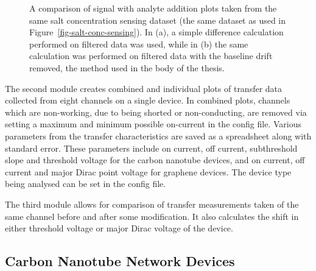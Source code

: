 \documentclass[
  a4paper,
]{scrbook}
\begin{document}
\begin{figure}
\begin{minipage}[t]{0.50\linewidth}
{{}

}

\subcaption{\label{fig-spaa-detrend}}
\end{minipage}%

\caption{\label{fig-spaa-plot-comparison}A comparison of signal with
analyte addition plots taken from the same salt concentration sensing
dataset (the same dataset as used in
Figure~\ref{fig-salt-conc-sensing}). In (a), a simple difference
calculation performed on filtered data was used, while in (b) the same
calculation was performed on filtered data with the baseline drift
removed, the method used in the body of the thesis.}

\end{figure}

The second module creates combined and individual plots of transfer data
collected from eight channels on a single device. In combined plots,
channels which are non-working, due to being shorted or non-conducting,
are removed via setting a maximum and minimum possible on-current in the
config file. Various parameters from the transfer characteristics are
saved as a spreadsheet along with standard error. These parameters
include on current, off current, subthreshold slope and threshold
voltage for the carbon nanotube devices, and on current, off current and
major Dirac point voltage for graphene devices. The device type being
analysed can be set in the config file.

The third module allows for comparison of transfer measurements taken of
the same channel before and after some modification. It also calculates
the shift in either threshold voltage or major Dirac voltage of the
device.

\hypertarget{sec-cnt-devices}{%
\subsection{Carbon Nanotube Network Devices}\label{sec-cnt-devices}}
\end{document}
